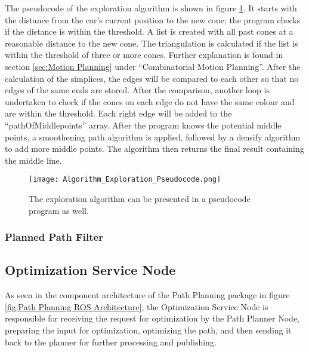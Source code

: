 The pseudocode of the exploration algorithm is shown in figure \ref{fig:Algorithm Exploration Pseudocode}. It starts with the distance from the car's current position to the new cone; the program checks if the distance is within the threshold. A list is created with all past cones at a reasonable distance to the new cone. The triangulation is calculated if the list is within the threshold of three or more cones. Further explanation is found in section \ref{sec:Motion Planning} under ``Combinatorial Motion Planning''. After the calculation of the simplices, the edges will be compared to each other so that no edges of the same ends are stored. After the comparison, another loop is undertaken to check if the cones on each edge do not have the same colour and are within the threshold. Each right edge will be added to the ``pathOfMiddlepoints'' array. After the program knows the potential middle points, a smoothening path algorithm is applied, followed by a densify algorithm to add more middle points. The algorithm then returns the final result containing the middle line.

\begin{figure}[H]
    \centering
    \texttt{[image: Algorithm\_Exploration\_Pseudocode.png]}
    \caption{The exploration algorithm can be presented in a pseudocode program as well.}
    \label{fig:Algorithm Exploration Pseudocode}
\end{figure}

\subsubsection{Planned Path Filter} \label{sec:Planned Path Filter}
\lipsum[1]

\subsection{Optimization Service Node} \label{sec:Optimization Service Node}
As seen in the component architecture of the Path Planning package in figure \ref{fig:Path Planning ROS Architecture}, the Optimization Service Node is responsible for receiving the request for optimization by the Path Planner Node, preparing the input for optimization, optimizing the path, and then sending it back to the planner for further processing and publishing.

